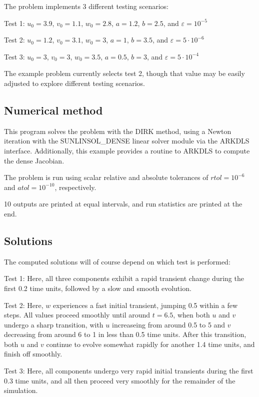 \documentclass[letterpaper,10pt,english]{sphinxmanual}
\begin{document}
The problem implements 3 different testing scenarios:

Test 1:  \(u_0=3.9\),  \(v_0=1.1\),  \(w_0=2.8\),
\(a=1.2\), \(b=2.5\), and \(\varepsilon=10^{-5}\)

Test 2:  \(u_0=1.2\), \(v_0=3.1\), \(w_0=3\), \(a=1\),
\(b=3.5\), and \(\varepsilon=5\cdot10^{-6}\)

Test 3:  \(u_0=3\), \(v_0=3\), \(w_0=3.5\), \(a=0.5\),
\(b=3\), and \(\varepsilon=5\cdot10^{-4}\)

The example problem currently selects test 2, though that value may be
easily adjusted to explore different testing scenarios.


\subsection{Numerical method}
\label{\detokenize{c_serial:id6}}
This program solves the problem with the DIRK method, using a
Newton iteration with the SUNLINSOL\_DENSE linear solver module via
the ARKDLS interface.  Additionally, this example provides a routine
to ARKDLS to compute the dense Jacobian.

The problem is run using scalar relative and absolute tolerances of
\(rtol=10^{-6}\) and \(atol=10^{-10}\), respectively.

10 outputs are printed at equal intervals, and run statistics
are printed at the end.


\subsection{Solutions}
\label{\detokenize{c_serial:id7}}
The computed solutions will of course depend on which test is
performed:

Test 1:  Here, all three components exhibit a rapid transient change
during the first 0.2 time units, followed by a slow and smooth
evolution.

Test 2: Here, \(w\) experiences a fast initial transient, jumping
0.5 within a few steps.  All values proceed smoothly until around
\(t=6.5\), when both \(u\) and \(v\) undergo a sharp
transition, with \(u\) increaseing from around 0.5 to 5 and
\(v\) decreasing from around 6 to 1 in less than 0.5 time units.
After this transition, both \(u\) and \(v\) continue to evolve
somewhat rapidly for another 1.4 time units, and finish off smoothly.

Test 3: Here, all components undergo very rapid initial transients
during the first 0.3 time units, and all then proceed very smoothly
for the remainder of the simulation.
\end{document}
